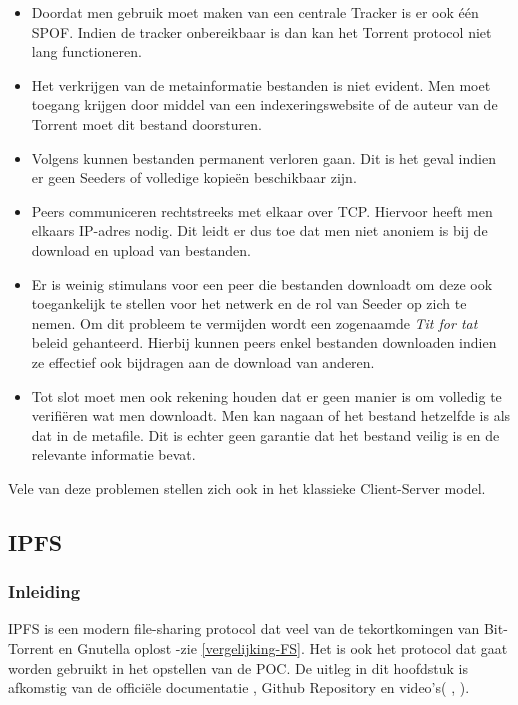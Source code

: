 \begin{itemize}
\item Doordat men gebruik moet maken van een centrale Tracker is er ook één SPOF. Indien de tracker onbereikbaar is dan kan het Torrent protocol niet lang functioneren.\\

\item Het verkrijgen van de metainformatie bestanden is niet evident. Men moet toegang krijgen door middel van een indexeringswebsite of de auteur van de Torrent moet dit bestand doorsturen.\\

\item Volgens \textcite{Thanekar2010} kunnen bestanden permanent verloren gaan. Dit is het geval indien er geen Seeders of volledige kopieën beschikbaar zijn.\\

\item Peers communiceren rechtstreeks met elkaar over TCP. Hiervoor heeft men elkaars IP-adres nodig. Dit leidt er dus toe dat men niet anoniem is bij de download en upload van bestanden.\\

\item Er is weinig stimulans voor een peer die bestanden downloadt om deze ook toegankelijk te stellen voor het netwerk en de rol van Seeder op zich te nemen. Om dit probleem te vermijden wordt een zogenaamde \textit{Tit for tat} beleid gehanteerd. Hierbij kunnen peers enkel bestanden downloaden indien ze effectief ook bijdragen aan de download van anderen.\\

\item Tot slot moet men ook rekening houden dat er geen manier is om volledig te verifiëren wat men downloadt. Men kan nagaan of het bestand hetzelfde is als dat in de metafile. Dit is echter geen garantie dat het bestand veilig is en de relevante informatie bevat. 
\end{itemize}

Vele van deze problemen stellen zich ook in het klassieke Client-Server model.

\subsection{IPFS}
\label{IPFS}
\subsubsection{Inleiding}
IPFS is een modern file-sharing protocol dat veel van de tekortkomingen van Bit-Torrent en Gnutella oplost -zie \ref{vergelijking-FS}. Het is ook het protocol dat gaat worden gebruikt in het opstellen van de POC. De uitleg in dit hoofdstuk is afkomstig van de officiële documentatie \autocite{}, Github Repository \autocite{} en video's(\autocite{} , \autocite{}).\\

